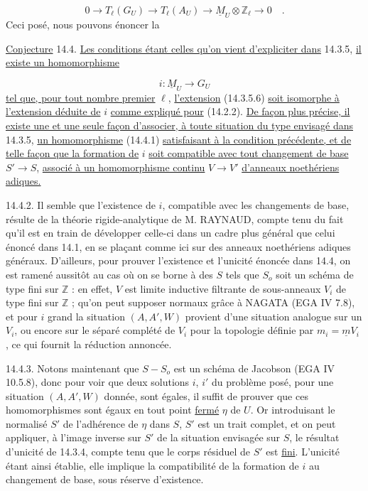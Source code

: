 \begin{equation}\tag{14.3.5.6}
0 \longrightarrow T_\ell(G_U) \longrightarrow T_\ell(A_U) \longrightarrow \underline{M}_U \otimes \mathbb{Z}_\ell \longrightarrow 0 \quad .
\end{equation}
Ceci posé, nous pouvons énoncer la



\underline{Conjecture} 14.4. \underline{Les conditions étant celles qu'on vient d'expliciter dans} 14.3.5, \underline{il existe un homomorphisme}

\begin{equation}\tag{14.4.1}
i : \underline{M}_U \longrightarrow G_U
\end{equation}
\underline{tel que, pour tout nombre premier} $\ell$, \underline{l'extension} (14.3.5.6) \underline{soit isomorphe à l'extension déduite de} $i$ \underline{comme expliqué pour} (14.2.2). \underline{De façon plus précise, il existe une et une seule façon d'associer, à toute situation du type envisagé dans} 14.3.5, \underline{un homomorphisme} (14.4.1) \underline{satisfaisant à la condition précédente, et de telle façon que la formation de} $i$ \underline{soit compatible avec tout changement de base} $S' \longrightarrow S$, \underline{associé à un homomorphisme continu} $V \longrightarrow V'$ \underline{d'anneaux noethériens adiques.}

14.4.2. Il semble que l'existence de $i$, compatible avec les changements de base, résulte de la théorie rigide-analytique de M. RAYNAUD, compte tenu du fait qu'il est en train de développer celle-ci dans un cadre plus général que celui énoncé dans 14.1, en se plaçant comme ici sur des anneaux noethériens adiques généraux. D'ailleurs, pour prouver l'existence et l'unicité énoncée dans 14.4, on est ramené aussitôt au cas où on se borne à des $S$ tels que $S_o$ soit un schéma de type fini sur $\mathbb{Z}$ : en effet, $V$ est limite inductive filtrante de sous-anneaux $V_i$ de type fini sur $\mathbb{Z}$ ; qu'on peut supposer normaux grâce à NAGATA (EGA IV 7.8), et pour $i$ grand la situation $(A,A',W)$ provient d'une situation analogue sur un $V_i$, ou encore sur le séparé complété de $V_i$ pour la topologie définie par $m_i = \underline{m} V_i$ , ce qui fournit la réduction annoncée.



14.4.3. Notons maintenant que $S-S_o$ est un schéma de Jacobson (EGA IV 10.5.8), donc pour voir que deux solutions $i$, $i'$ du problème posé, pour une situation $(A,A',W)$ donnée, sont égales, il suffit de prouver que ces homomorphismes sont égaux en tout point \underline{fermé} $\eta$ de $U$. Or introduisant le normalisé $S'$ de l'adhérence de $\eta$ dans $S$, $S'$ est un trait complet, et on peut appliquer, à l'image inverse sur $S'$ de la situation envisagée sur $S$, le résultat d'unicité de 14.3.4, compte tenu que le corps résiduel de $S'$ est \underline{fini}. L'unicité étant ainsi établie, elle implique la compatibilité de la formation de $i$ au changement de base, sous réserve d'existence.

